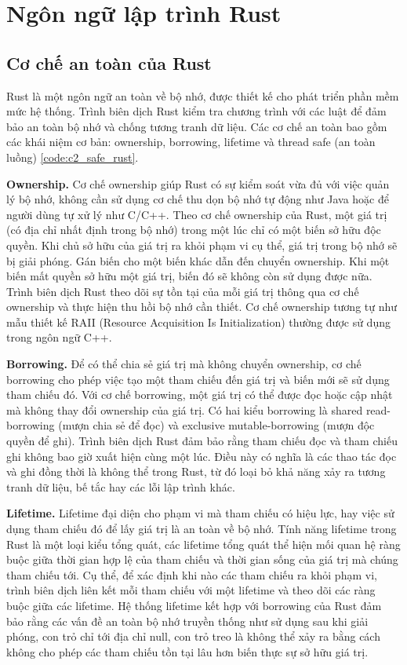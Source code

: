 \section{Ngôn ngữ lập trình Rust}

\subsection{Cơ chế an toàn của Rust}

Rust là một ngôn ngữ an toàn về bộ nhớ, được thiết kế cho phát triển phần mềm mức hệ thống.
Trình biên dịch Rust kiểm tra chương trình với các luật để đảm bảo an toàn bộ nhớ và chống tương tranh dữ liệu.
Các cơ chế an toàn bao gồm các khái niệm cơ bản: ownership, borrowing, lifetime và thread safe (an toàn luồng) \ref{code:c2_safe_rust}.

\textbf{Ownership.} Cơ chế ownership giúp Rust có sự kiểm soát vừa đủ với việc quản lý bộ nhớ, không cần sử dụng cơ chế thu dọn bộ nhớ tự động như Java hoặc để người dùng tự xử lý như C/C++.
Theo cơ chế ownership của Rust, một giá trị (có địa chỉ nhất định trong bộ nhớ) trong một lúc chỉ có một biến sở hữu độc quyền.
Khi chủ sở hữu của giá trị ra khỏi phạm vi cụ thể, giá trị trong bộ nhớ sẽ bị giải phóng.
Gán biến cho một biến khác dẫn đến chuyển ownership.
Khi một biến mất quyền sở hữu một giá trị, biến đó sẽ không còn sử dụng được nữa.
Trình biên dịch Rust theo dõi sự tồn tại của mỗi giá trị thông qua cơ chế ownership và thực hiện thu hồi bộ nhớ cần thiết.
Cơ chế ownership tương tự như mẫu thiết kế RAII (Resource Acquisition Is Initialization) \cite{cppreferenceRAIICppreferencecom} thường được sử dụng trong ngôn ngữ C++.

\textbf{Borrowing.} Để có thể chia sẻ giá trị mà không chuyển ownership, cơ chế borrowing cho phép việc tạo một tham chiếu đến giá trị và biến mới sẽ sử dụng tham chiếu đó.
Với cơ chế borrowing, một giá trị có thể được đọc hoặc cập nhật mà không thay đổi ownership của giá trị.
Có hai kiểu borrowing là shared read-borrowing (mượn chia sẻ để đọc) và exclusive mutable-borrowing (mượn độc quyền để ghi).
Trình biên dịch Rust đảm bảo rằng tham chiếu đọc và tham chiếu ghi không bao giờ xuất hiện cùng một lúc.
Điều này có nghĩa là các thao tác đọc và ghi đồng thời là không thể trong Rust, từ đó loại bỏ khả năng xảy ra tương tranh dữ liệu, bế tắc hay các lỗi lập trình khác.

\textbf{Lifetime.} Lifetime đại diện cho phạm vi mà tham chiếu có hiệu lực, hay việc sử dụng tham chiếu đó để lấy giá trị là an toàn về bộ nhớ.
Tính năng lifetime trong Rust là một loại kiểu tổng quát, các lifetime tổng quát thể hiện mối quan hệ ràng buộc giữa thời gian hợp lệ của tham chiếu và thời gian sống của giá trị mà chúng tham chiếu tới.
Cụ thể, để xác định khi nào các tham chiếu ra khỏi phạm vi, trình biên dịch liên kết mỗi tham chiếu với một lifetime và theo dõi các ràng buộc giữa các lifetime.
Hệ thống lifetime kết hợp với borrowing của Rust đảm bảo rằng các vấn đề an toàn bộ nhớ truyền thống như sử dụng sau khi giải phóng, con trỏ chỉ tới địa chỉ null, con trỏ treo là không thể xảy ra bằng cách không cho phép các tham chiếu tồn tại lâu hơn biến thực sự sở hữu giá trị.

